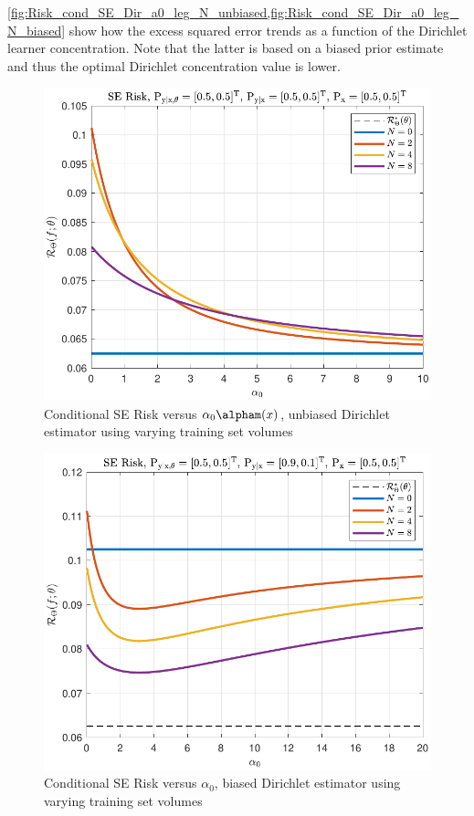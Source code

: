 \documentclass[12pt]{report}
\begin{document}


\cref{fig:Risk_cond_SE_Dir_a0_leg_N_unbiased,fig:Risk_cond_SE_Dir_a0_leg_N_biased} show how the excess squared error trends as a function of the Dirichlet learner concentration. Note that the latter is based on a biased prior estimate and thus the optimal Dirichlet concentration value is lower.
\begin{figure}
\centering
\includegraphics[width=0.7\linewidth]{Risk_cond_SE_Dir_a0_leg_N_unbiased.pdf}
\caption{Conditional SE Risk versus $\alpha_0 \alpham(x)$, unbiased Dirichlet estimator using varying training set volumes}
\label{fig:Risk_cond_SE_Dir_a0_leg_N_unbiased}
\end{figure}
\begin{figure}
\centering
\includegraphics[width=0.7\linewidth]{Risk_cond_SE_Dir_a0_leg_N_biased.pdf}
\caption{Conditional SE Risk versus $\alpha_0$, biased Dirichlet estimator using varying training set volumes}
\label{fig:Risk_cond_SE_Dir_a0_leg_N_biased}
\end{figure}
\end{document}
